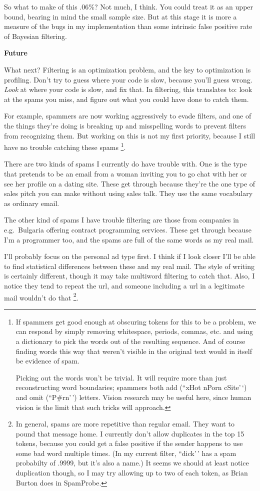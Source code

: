 So what to make of this .06\%? Not much, I think. You could treat it as
an upper bound, bearing in mind the small sample size. But at this stage
it is more a measure of the bugs in my implementation than some
intrinsic false positive rate of Bayesian filtering.

\textbf{Future}

What next? Filtering is an optimization problem, and the key to
optimization is profiling. Don't try to guess where your code is slow,
because you'll guess wrong. \emph{Look} at where your code is slow, and
fix that. In filtering, this translates to: look at the spams you miss,
and figure out what you could have done to catch them.

For example, spammers are now working aggressively to evade filters, and
one of the things they're doing is breaking up and misspelling words to
prevent filters from recognizing them. But working on this is not my
first priority, because I still have no trouble catching these spams
\footnote{If spammers get good enough at obscuring tokens for this to be
a problem, we can respond by simply removing whitespace, periods,
commas, etc. and using a dictionary to pick the words out of the
resulting sequence. And of course finding words this way that weren't
visible in the original text would in itself be evidence of spam.

Picking out the words won't be trivial. It will require more than just
reconstructing word boundaries; spammers both add (``xHot nPorn
cSite'\,`) and omit (``P\#rn'\,') letters. Vision research may be useful
here, since human vision is the limit that such tricks will approach.}.

There are two kinds of spams I currently do have trouble with. One is
the type that pretends to be an email from a woman inviting you to go
chat with her or see her profile on a dating site. These get through
because they're the one type of sales pitch you can make without using
sales talk. They use the same vocabulary as ordinary email.

The other kind of spams I have trouble filtering are those from
companies in e.g.~Bulgaria offering contract programming services. These
get through because I'm a programmer too, and the spams are full of the
same words as my real mail.

I'll probably focus on the personal ad type first. I think if I look
closer I'll be able to find statistical differences between these and my
real mail. The style of writing is certainly different, though it may
take multiword filtering to catch that. Also, I notice they tend to
repeat the url, and someone including a url in a legitimate mail
wouldn't do that \footnote{In general, spams are more repetitive than regular email. They
want to pound that message home. I currently don't allow duplicates in
the top 15 tokens, because you could get a false positive if the sender
happens to use some bad word multiple times. (In my current filter,
``dick'\,' has a spam probabilty of .9999, but it's also a name.) It
seems we should at least notice duplication though, so I may try
allowing up to two of each token, as Brian Burton does in SpamProbe.}.

